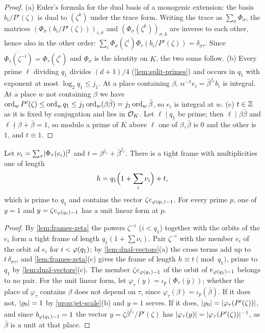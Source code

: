 \begin{proof}
(a) Euler's formula for the dual basis of a monogenic extension: the basis $b_i/P'(\zeta)$ is dual
to $(\zeta^k)$ under the trace form. Writing the trace as $\sum_\sigma\Phi_\sigma$, the matrices
$(\Phi_\sigma(b_i/P'(\zeta)))_{i,\sigma}$ and $(\Phi_\sigma(\zeta^k))_{\sigma,k}$ are inverse to each other,
hence also in the other order: $\sum_i\Phi_\sigma(\zeta^i)\Phi_\tau(b_i/P'(\zeta))=\delta_{\sigma\tau}$.
Since $\overline{\Phi_\tau(\zeta^{-i})}=\Phi_\tau(\zeta^i)$ and $\Phi_\sigma$ is the identity on $K$, the
two sums follow. (b) Every prime $\ell$ dividing $q_1$ divides $(d+1)/4$ (\cref{lem:split-primes}) and
occurs in $q_1$ with exponent at most $\log_2q_1\le j_1$. At a place containing $\beta$,
$\alpha^{-1}e_i=\bar\beta^{j_1}b_i$ is integral. At a place $w$ not containing $\beta$ we have
$\operatorname{ord}_wP'(\zeta)\le\operatorname{ord}_w q_1\le j_1\operatorname{ord}_w(\beta\bar\beta)=j_1\operatorname{ord}_w\bar\beta$, so $e_i$ is integral at $w$.
(c) $t\in\mathbb{Z}$ as it is fixed by conjugation and lies in $\mathcal{O}_K$. Let $\ell\mid q_1$ be prime; then
$\ell\mid\beta\bar\beta$ and $\ell\nmid\beta+\bar\beta=1$, so modulo a prime of $K$ above $\ell$ one of
$\beta,\bar\beta$ is $0$ and the other is $1$, and $t\equiv1$.
\end{proof}

\begin{proposition}\label{prop:coprime-frame}
Let $\nu_i=\sum_\tau\lvert \Phi_\tau(e_i)\rvert^2$ and $t=\beta^{j_1}+\bar\beta^{j_1}$. There is a tight frame with
multiplicities one of length
\[
  h=q_1\Bigl(1+\sum_i\nu_i\Bigr)+t,
\]
which is prime to $q_1$ and contains the vector $\zeta e_{\varphi(q_1)-1}$. For every prime $p$, one of
$y=1$ and $y=\zeta e_{\varphi(q_1)-1}$ has a unit linear form at $p$.
\end{proposition}

\begin{proof}
By \cref{lem:frames-zeta} the powers $\zeta^{-i}$ ($i<q_1$) together with the orbits of the $e_i$ form a
tight frame of length $q_1(1+\sum\nu_i)$. Pair $\zeta^{-i}$ with the member $e_i$ of the orbit of $e_i$
for $i<\varphi(q_1)$; by \cref{lem:dual-vectors}(a) the cross terms add up to $t\,\delta_{\sigma\tau}$,
and \cref{lem:frames-zeta}(c) gives the frame of length $h\equiv t\pmod{q_1}$, prime to $q_1$ by
\cref{lem:dual-vectors}(c). The member $\zeta e_{\varphi(q_1)-1}$ of the orbit of $e_{\varphi(q_1)-1}$
belongs to no pair. For the unit linear form, let $\varphi_\tau(y)=\iota_p(\Phi_\tau(\bar y))$; whether
the place of $\varphi_\tau$ contains $\beta$ does not depend on $\tau$, since $\varphi_\tau(\beta)=
\iota_p(\bar\beta)$. If it does not, $\lvert \varrho_0\rvert=1$ by \cref{prop:jet-scale}(b) and $y=1$ serves.
If it does, $\lvert \varrho_0\rvert=\lvert \varphi_\tau(P'(\zeta))\rvert$, and since $b_{\varphi(q_1)-1}=1$ the vector
$y=\zeta\bar\beta^{j_1}/P'(\zeta)$ has $\lvert \varphi_\tau(y)\rvert=\lvert \varphi_\tau(P'(\zeta))\rvert^{-1}$, as
$\bar\beta$ is a unit at that place.
\end{proof}

